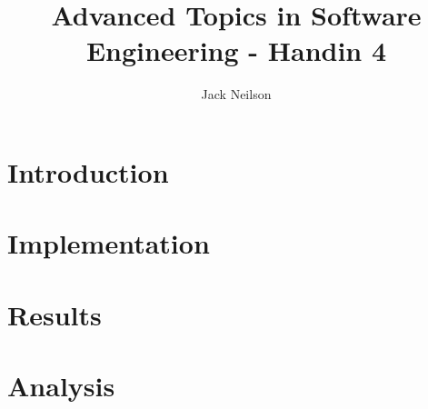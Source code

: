 \documentclass[12pt]{article}
\begin{document}
\title{Advanced Topics in Software Engineering - Handin 4}
\author{Jack Neilson}
\maketitle
\newpage
\tableofcontents
\newpage

\section{Introduction}
\section{Implementation}
\section{Results}
\section{Analysis}
\end{document}
